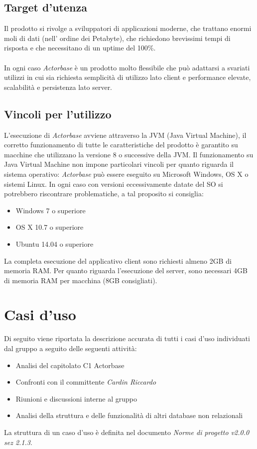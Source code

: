 \documentclass[a4paper]{article}
\begin{document}
	\subsection{Target d'utenza}
		Il prodotto si rivolge a sviluppatori di applicazioni moderne, che trattano enormi moli di dati (nell'
		ordine dei Petabyte), che richiedono brevissimi tempi di risposta e che necessitano di un uptime 
		del 100\%.
		\\ \\
		In ogni caso \emph{Actorbase} è un prodotto molto flessibile che può adattarsi a svariati utilizzi in cui sia richiesta semplicità di utilizzo lato client e performance elevate, scalabilità e persistenza lato server.
	\subsection{Vincoli per l'utilizzo}
		L'esecuzione di \emph{Actorbase} avviene attraverso la JVM (Java Virtual Machine), il corretto funzionamento di tutte le caratteristiche del prodotto è garantito su macchine che utilizzano la versione 8 o successive della JVM. Il funzionamento su Java Virtual Machine non impone particolari vincoli per quanto riguarda il sistema operativo: \emph{Actorbase} può essere eseguito su Microsoft Windows, OS X o sistemi Linux. In ogni caso con versioni eccessivamente datate del SO si potrebbero riscontrare problematiche, a tal proposito si consiglia:
		\begin{itemize}
		\item Windows 7 o superiore
		\item OS X 10.7 o superiore
		\item Ubuntu 14.04 o superiore
\end{itemize}
		La completa esecuzione del applicativo client sono richiesti almeno 2GB di memoria RAM. Per quanto riguarda l'esecuzione del server, sono necessari 4GB di memoria RAM per macchina (8GB consigliati). 
	
	\newpage \section{Casi d'uso}
		Di seguito viene riportata la descrizione accurata di tutti i casi d'uso individuati dal gruppo a seguito
		delle seguenti attività:
		\begin{itemize}
			\item Analisi del capitolato C1 Actorbase
			\item Confronti con il committente \emph{Cardin Riccardo}
			\item Riunioni e discussioni interne al gruppo
			\item Analisi della struttura e delle funzionalità di altri database non relazionali
		\end{itemize}
		La struttura di un caso d'uso è definita nel documento \emph{Norme di progetto v2.0.0 sez 2.1.3}.
\end{document}
